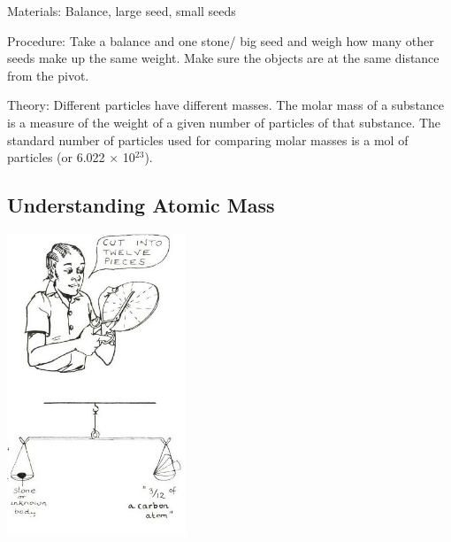 \begin{multicols}{2}
\begin{description*}
\item[Materials:]{Balance, large seed, small seeds}
\item[Procedure:]{Take a balance and one stone/
big seed and weigh how
many other seeds make up the same weight. Make sure the objects are at the same distance
from the pivot.}
\item[Theory:]{Different particles have different masses. The molar mass of a substance is a measure of the weight of a given number of particles of that substance. The standard number of particles used for comparing molar masses is a mol of particles (or 6.022 $\times$ 10$^{23}$).}
\end{description*}

\subsection{Understanding Atomic Mass}

\begin{center}
\includegraphics[width=0.4\textwidth]{./img/source/atomic-mass.jpg}
\end{center}


\end{multicols}
